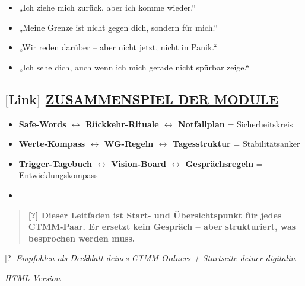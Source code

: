 \begin{itemize}
\tightlist
\item
  „Ich ziehe mich zurück, aber ich komme wieder.``
\item
  „Meine Grenze ist nicht gegen dich, sondern für mich.``
\item
  „Wir reden darüber -- aber nicht jetzt, nicht in Panik.``
\item
  „Ich sehe dich, auch wenn ich mich gerade nicht spürbar zeige.``
\end{itemize}

\hypertarget{zusammenspiel-der-module}{%
\subsection{\texorpdfstring{\textbf{[Link] \ul{ZUSAMMENSPIEL DER MODULE}}}{[Link] ZUSAMMENSPIEL DER MODULE}}\label{zusammenspiel-der-module}}

\begin{itemize}
\tightlist
\item
  \textbf{Safe-Words $\leftrightarrow$ Rückkehr-Rituale $\leftrightarrow$ Notfallplan} = Sicherheitskreis
\item
  \textbf{Werte-Kompass $\leftrightarrow$ WG-Regeln $\leftrightarrow$ Tagesstruktur} = Stabilitätsanker
\item
  \textbf{Trigger-Tagebuch $\leftrightarrow$ Vision-Board $\leftrightarrow$ Gesprächsregeln} = Entwicklungskompass
\item
\end{itemize}

\begin{quote}
\textbf{[?] Dieser Leitfaden ist Start- und Übersichtspunkt für jedes CTMM-Paar. Er ersetzt kein Gespräch -- aber strukturiert, was besprochen werden muss.}
\end{quote}

[?] \emph{Empfohlen als Deckblatt deines CTMM-Ordners + Startseite deiner digitalin}

\emph{HTML-Version}
